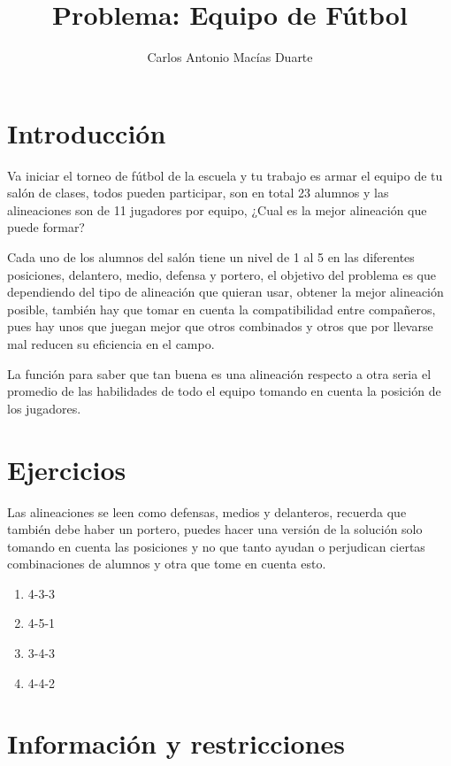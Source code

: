 \documentclass[10pt,letterpaper,twoside,openright]{article}
\author{Carlos Antonio Macías Duarte}
\title{Problema: Equipo de Fútbol}
\begin{document}
	\maketitle
		
	\section{Introducción}
	
		Va iniciar el torneo de fútbol de la escuela y tu trabajo es armar el equipo de tu salón de clases, todos pueden participar, son en total 23 alumnos y las alineaciones son de 11 jugadores por equipo, ¿Cual es la mejor alineación que puede formar?
		
		Cada uno de los alumnos del salón tiene un nivel de 1 al 5 en las diferentes posiciones, delantero, medio, defensa y portero, el objetivo del problema es que dependiendo del tipo de alineación que quieran usar, obtener la mejor alineación posible, también hay que tomar en cuenta la compatibilidad entre compañeros, pues hay unos que juegan mejor que otros combinados y otros que por llevarse mal reducen su eficiencia en el campo.
		
		La función para saber que tan buena es una alineación respecto a otra seria el promedio de las habilidades de todo el equipo tomando en cuenta la posición de los jugadores.
		
	\section{Ejercicios}
	
	Las alineaciones se leen como defensas, medios y delanteros, recuerda que también debe haber un portero, puedes hacer una versión de la solución solo tomando en cuenta las posiciones y no que tanto ayudan o perjudican ciertas combinaciones de alumnos y otra que tome en cuenta esto.
		
		\begin{enumerate}
			\item 4-3-3
			\item 4-5-1
			\item 3-4-3
			\item 4-4-2
		\end{enumerate}
		
	\section{Información y restricciones}
	
\end{document}

